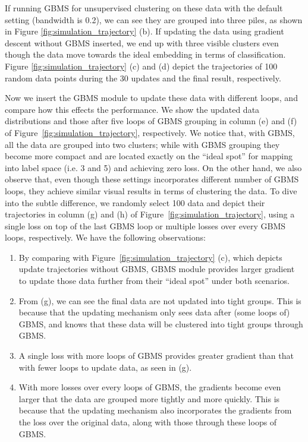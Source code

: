\documentclass[10pt,twocolumn,letterpaper]{article}
\begin{document}
If running GBMS for unsupervised clustering on these data with the default setting (bandwidth is 0.2),
we can see they are grouped into three piles,
as shown in Figure \ref{fig:simulation_trajectory} (b).
If updating the data using gradient descent without GBMS inserted,
we end up with three visible clusters even though the data move towards the ideal embedding in terms of classification.
Figure \ref{fig:simulation_trajectory} (c) and (d) depict the trajectories of 100 random data points during the 30 updates and the final result, respectively.


Now we insert the GBMS module to update these data with different loops,
and compare how this effects the performance.
We show the updated data distributions and those after five loops of GBMS grouping in column (e) and (f) of Figure~\ref{fig:simulation_trajectory},
respectively.
We notice that, with GBMS,
all the data are grouped into two clusters;
while with GBMS grouping they become more compact and are located exactly on
the ``ideal spot'' for mapping into label space (i.e. 3 and 5) and achieving
zero loss.
On the other hand,
we also observe that, even though these settings incorporates different number of GBMS loops,
they achieve similar visual results in terms of clustering the data.
To dive into the subtle difference,
we randomly select 100 data and depict their trajectories in column (g) and (h)
of Figure~\ref{fig:simulation_trajectory},
using a single loss on top of the last GBMS loop or multiple losses over every GBMS loops,
respectively.
We have the following observations:
\begin{enumerate}
  \item By comparing with Figure~\ref{fig:simulation_trajectory} (c),
    which depicts update trajectories without GBMS,
    GBMS module provides larger gradient to update those data further from their ``ideal spot'' under both scenarios.
  \item From (g),
    we can see the final data are not updated into tight groups.
    This is because that the updating mechanism only sees data after (some loops of) GBMS,
    and knows that these data will be clustered into tight groups through GBMS.
  \item A single loss with more loops of GBMS provides greater gradient than that with fewer loops to update data, as seen in (g).
  \item With more losses over every loops of GBMS,
    the gradients become even larger that the data are grouped more tightly and more quickly.
    This is because that the updating mechanism also incorporates the gradients from the loss over the original data,
    along with those through these loops of GBMS.
\end{enumerate}
\end{document}

